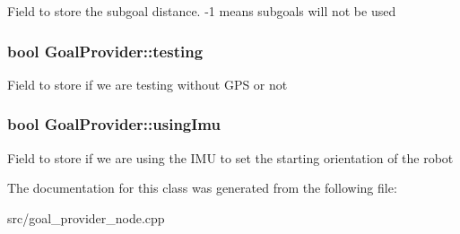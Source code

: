 \-Field to store the subgoal distance. -\/1 means subgoals will not be used \hypertarget{classGoalProvider_aefb932adf68011afd36e0796a001c147}{
\subsubsection[{testing}]{\setlength{\rightskip}{0pt plus 5cm}bool {\bf \-Goal\-Provider\-::testing}}}\label{classGoalProvider_aefb932adf68011afd36e0796a001c147}
\-Field to store if we are testing without \-G\-P\-S or not \hypertarget{classGoalProvider_a344bf023e320a812a824654c69531f31}{
\subsubsection[{using\-Imu}]{\setlength{\rightskip}{0pt plus 5cm}bool {\bf \-Goal\-Provider\-::using\-Imu}}}\label{classGoalProvider_a344bf023e320a812a824654c69531f31}
\-Field to store if we are using the \-I\-M\-U to set the starting orientation of the robot 

\-The documentation for this class was generated from the following file\-:\begin{DoxyCompactItemize}
\item 
src/goal\-\_\-provider\-\_\-node.\-cpp\end{DoxyCompactItemize}
